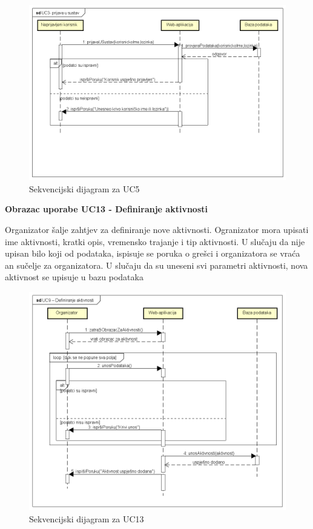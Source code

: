 \begin{figure}[H]
	\includegraphics[scale=0.6]{dijagrami/UC3- prijava u sustav.png} %
	\centering
	\caption{Sekvencijski dijagram za UC5}
	\label{fig:promjene}
\end{figure}

\pagebreak







\textbf{Obrazac uporabe UC13 - Definiranje aktivnosti}

Organizator šalje zahtjev za definiranje nove aktivnosti. Ogranizator mora upisati ime aktivnosti, kratki opis, vremensko trajanje i tip aktivnosti. U slučaju da nije upisan bilo koji od podataka, ispisuje se poruka o grešci i organizatora se vraća an sučelje za organizatora. U slučaju da su uneseni svi parametri aktivnosti, nova aktivnost se upisuje u bazu podataka


\begin{figure}[H]
	\includegraphics[scale=0.6]{dokumentacija/dijagrami/UC9 ΓÇô Definiranje aktivnosti.png} %
	\centering
	\caption{Sekvencijski dijagram za UC13}
	\label{fig:promjene}
\end{figure}

